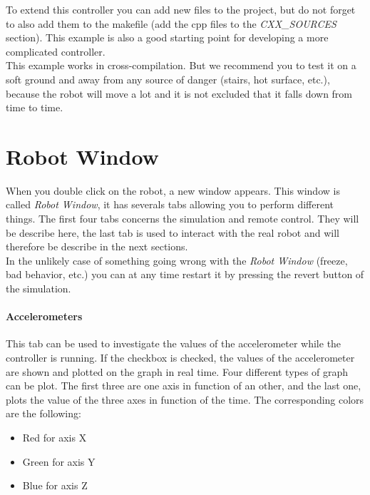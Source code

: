 \documentclass[a4paper, 12pt]{article}  		%
\begin{document}
To extend this controller you can add new files to the project, but do not forget to also add them to the makefile (add the cpp files to the \textit{CXX\_SOURCES} section). This example is also a good starting point for developing a more complicated controller.\\

This example works in cross-compilation. But we recommend you to test it on a soft ground and away from any source of danger (stairs, hot surface, etc.), because the robot will move a lot and it is not excluded that it falls down from time to time.\\



\newpage
\section{Robot Window}

When you double click on the robot, a new window appears. This window is called \textit{Robot Window}, it has severals tabs allowing you to perform different things. The first four tabs concerns the simulation and remote control. They will be describe here, the last tab is used to interact with the real robot and will therefore be describe in the next sections.\\

In the unlikely case of something going wrong with the \textit{Robot Window} (freeze, bad behavior, etc.) you can at any time restart it by pressing the revert button of the simulation.\\

\paragraph*{Accelerometers} 
This tab can be used to investigate the values of the accelerometer while the controller is running. If the checkbox is checked, the values of the accelerometer are shown and plotted on the graph in real time. Four different types of graph can be plot. The first three are one axis in function of an other, and the last one, plots the value of the three axes in function of the time. The corresponding colors are the following:\\
\begin{itemize}
\item Red for axis X
\item Green for axis Y
\item Blue for axis Z
\end{itemize}
\end{document}
